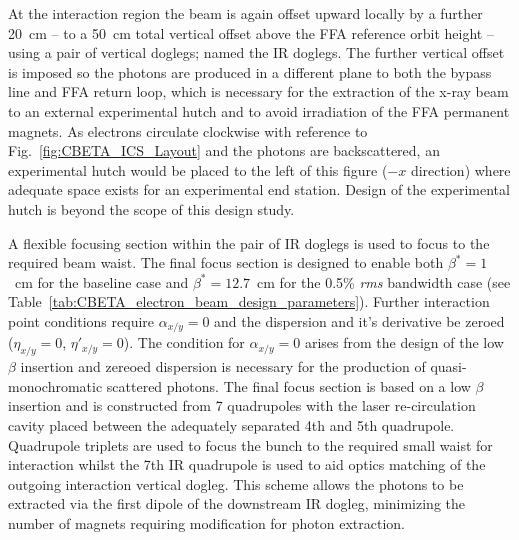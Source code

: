 \documentclass[../main.tex]{subfiles}
\begin{document}
At the interaction region the beam is again offset upward locally by a further 20~\si{\centi\meter} -- to a 50~\si{\centi\meter} total vertical offset above the FFA reference orbit height -- using a pair of vertical doglegs; named the IR doglegs. The further vertical offset is imposed so the photons are produced in a different plane to both the bypass line and FFA return loop, which is necessary for the extraction of the x-ray beam to an external experimental hutch and to avoid irradiation of the FFA permanent magnets. As electrons circulate clockwise with reference to Fig.~\ref{fig:CBETA_ICS_Layout} and the photons are backscattered, an experimental hutch would be placed to the left of this figure ($-x$ direction) where adequate space exists for an experimental end station. Design of the experimental hutch is beyond the scope of this design study. 

A flexible focusing section within the pair of IR doglegs is used to focus to the required beam waist. The final focus section is designed to enable both $\beta^{*} = 1$~\si{\centi\meter} for the baseline case and $\beta^{*} = 12.7$~\si{\centi\meter} for the 0.5\% \textit{rms} bandwidth case (see Table~\ref{tab:CBETA_electron_beam_design_parameters}). Further interaction point conditions require $\alpha_{x/y} =0$ and the dispersion and it's derivative be zeroed ($\eta_{x/y} = 0$, $\eta'_{x/y} = 0$). The condition for $\alpha_{x/y} = 0$ arises from the design of the low $\beta$ insertion and zereoed dispersion is necessary for the production of quasi-monochromatic scattered photons. The final focus section is based on a low $\beta$ insertion \cite{chao2013handbook} and is constructed from 7 quadrupoles with the laser re-circulation cavity placed between the adequately separated 4th and 5th quadrupole. Quadrupole triplets are used to focus the bunch to the required small waist for interaction whilst the 7th IR quadrupole is used to aid optics matching of the outgoing interaction vertical dogleg. This scheme allows the photons to be extracted via the first dipole of the downstream IR dogleg, minimizing the number of magnets requiring modification for photon extraction. 
\end{document}
